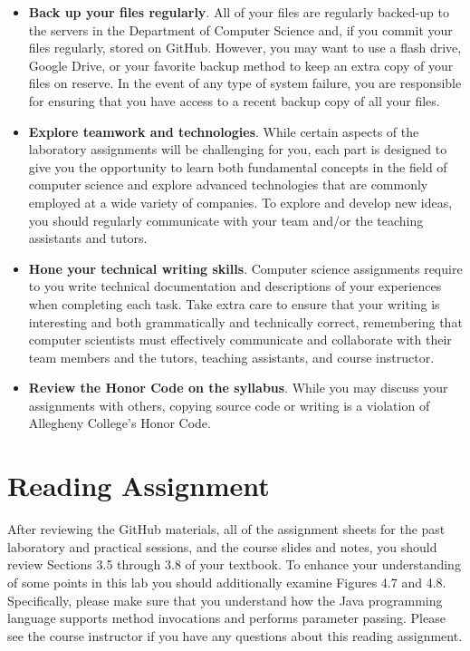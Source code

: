 \documentclass[11pt]{article}
\begin{document}
\begin{itemize}
\item {\bf Back up your files regularly}. All of your files are regularly
  backed-up to the servers in the Department of Computer Science and, if you
  commit your files regularly, stored on GitHub. However, you may want to use a
  flash drive, Google Drive, or your favorite backup method to keep an extra
  copy of your files on reserve. In the event of any type of system failure, you
  are responsible for ensuring that you have access to a recent backup copy of
  all your files.

\item {\bf Explore teamwork and technologies}. While certain aspects of the
  laboratory assignments will be challenging for you, each part is designed to
  give you the opportunity to learn both fundamental concepts in the field of
  computer science and explore advanced technologies that are commonly employed
  at a wide variety of companies. To explore and develop new ideas, you should
  regularly communicate with your team and/or the teaching assistants and
  tutors.

\item {\bf Hone your technical writing skills}. Computer science assignments
  require to you write technical documentation and descriptions of your
  experiences when completing each task. Take extra care to ensure that your
  writing is interesting and both grammatically and technically correct,
  remembering that computer scientists must effectively communicate and
  collaborate with their team members and the tutors, teaching assistants, and
  course instructor.

\item {\bf Review the Honor Code on the syllabus}. While you may discuss your
  assignments with others, copying source code or writing is a violation of
  Allegheny College's Honor Code.

\end{itemize}

\section*{Reading Assignment}

After reviewing the GitHub materials, all of the assignment sheets for the past
laboratory and practical sessions, and the course slides and notes, you should
review Sections 3.5 through 3.8 of your textbook. To enhance your understanding
of some points in this lab you should additionally examine Figures 4.7 and 4.8.
Specifically, please make sure that you understand how the Java programming
language supports method invocations and performs parameter passing. Please see
the course instructor if you have any questions about this reading assignment.
\end{document}
